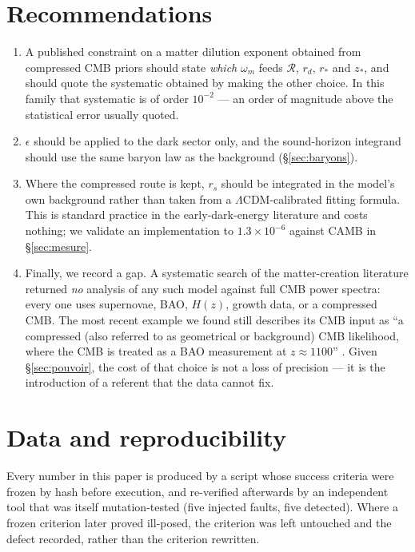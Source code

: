 \documentclass[11pt,a4paper]{article}
\begin{document}
\section{Recommendations}
\label{sec:reco}

\begin{enumerate}
\item A published constraint on a matter dilution exponent obtained from compressed CMB
      priors should state \emph{which} $\omega_m$ feeds $\mathcal{R}$, $r_d$, $r_\ast$ and
      $z_\ast$, and should quote the systematic obtained by making the other choice. In this
      family that systematic is of order $10^{-2}$ --- an order of magnitude above the
      statistical error usually quoted.
\item $\epsilon$ should be applied to the dark sector only, and the sound-horizon integrand
      should use the same baryon law as the background (\S\ref{sec:baryons}).
\item Where the compressed route is kept, $r_s$ should be integrated in the model's own
      background rather than taken from a $\Lambda$CDM-calibrated fitting formula. This is
      standard practice in the early-dark-energy literature and costs nothing; we validate an
      implementation to $1.3\times10^{-6}$ against CAMB in \S\ref{sec:mesure}.
\item Finally, we record a gap. A systematic search of the matter-creation literature
      returned \emph{no} analysis of any such model against full CMB power spectra: every one
      uses supernovae, BAO, $H(z)$, growth data, or a compressed CMB. The most recent example
      we found still describes its CMB input as ``a compressed (also referred to as
      geometrical or background) CMB likelihood, where the CMB is treated as a BAO
      measurement at $z\approx1100$'' \citep{schiavone2026}. Given \S\ref{sec:pouvoir}, the
      cost of that choice is not a loss of precision --- it is the introduction of a
      referent that the data cannot fix.
\end{enumerate}

\section*{Data and reproducibility}
Every number in this paper is produced by a script whose success criteria were frozen by
hash before execution, and re-verified afterwards by an independent tool that was itself
mutation-tested (five injected faults, five detected). Where a frozen criterion later proved
ill-posed, the criterion was left untouched and the defect recorded, rather than the
criterion rewritten.
\end{document}
